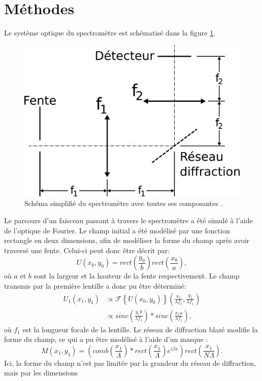 \documentclass[conference]{IEEEtran}
\begin{document}
\section{Méthodes \label{methodes}}
Le système optique du spectromètre est schématisé dans la figure \ref{4f}.
\begin{figure}[H]
    \centering
    \includegraphics[scale=0.4]{4f.png}
    \caption{Schéma simplifié du spectromètre avec toutes ses composantes \cite{procedurier}. \label{4f}}
\end{figure}
Le parcours d'un faisceau passant à travers le spectromètre a été simulé à l'aide 
de l'optique de Fourier. Le champ initial a été modélisé par une fonction rectangle en deux dimensions,
afin de modéliser la forme du champ après avoir traversé une fente. Celui-ci peut donc être décrit par:
\[U(x_0,y_0)=rect(\frac{y_0}{b})rect(\frac{x_0}{a}),\]
où $a$ et $b$ sont la largeur et la hauteur de la fente respectivement. Le champ transmis par 
la première lentille a donc pu être déterminé:
\begin{align*}
    U_1(x_1,y_1)&\propto\mathscr{F}\left\{U(x_0,y_0)\right\}(\frac{x_1}{\lambda f_1},\frac{y_1}{\lambda f_1})\\
    &\propto sinc(\frac{y_1b}{\lambda f_1})\ast sinc(\frac{x_1a}{\lambda f_1}),
\end{align*}
où $f_1$ est la longueur focale de la lentille. Le réseau de diffraction blazé modifie la forme du champ, ce qui a pu être
modélisé à l'aide d'un masque \cite{procedurier}:
\[M(x_1,y_1)=(comb(\frac{x_1}{\Lambda})\ast rect(\frac{x_1}{\Lambda})e^{i\beta x})rect(\frac{x_1}{N\Lambda}).\]
Ici, la forme du champ n'est pas limitée par la grandeur du réseau de diffraction, mais par les dimensions
\end{document}
